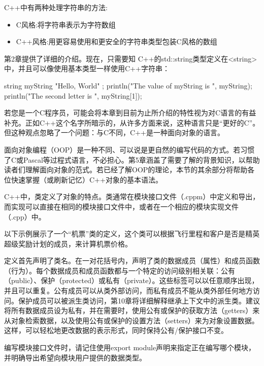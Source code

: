 
C++中有两种处理字符串的方法:

\begin{itemize}
\item
C风格:将字符串表示为字符数组

\item
C++风格:用更容易使用和更安全的字符串类型包装C风格的数组
\end{itemize}

第2章提供了详细的介绍。现在，只需要知 C++的std::string类型定义在<string>中，并且可以像使用基本类型一样使用C++字符串：

\begin{cpp}
string myString { "Hello, World" };
println("The value of myString is {}", myString);
println("The second letter is {}", myString[1]);
\end{cpp}


若您是一个C程序员，可能会将本章到目前为止所介绍的特性视为对C语言的有益补充。正如C++这个名字所暗示的，从许多方面来说，这种语言只是“更好的C”。但这种观点忽略了一个问题：与C不同，C++是一种面向对象的语言。

面向对象编程（OOP）是一种不同、可以说是更自然的编写代码的方式。若习惯了C或Pascal等过程式语言，不必担心。第5章涵盖了需要了解的背景知识，以帮助读者们理解面向对象的范式。若已经了解OOP的理论，本节的其余部分将帮助各位快速掌握（或刷新记忆）C++对象的基本语法。


C++中，类定义了对象的特点。类通常在模块接口文件（.cppm）中定义和导出，而实现可以直接在相同的模块接口文件中，或者在一个相应的模块实现文件（.cpp）中。

以下示例展示了一个“机票”类的定义，这个类可以根据飞行里程和客户是否是精英超级奖励计划的成员，来计算机票价格。

定义首先声明了类名。在一对花括号内，声明了类的数据成员（属性）和成员函数（行为）。每个数据成员和成员函数都与一个特定的访问级别相关联：公有（public）、保护（protected）或私有（private）。这些标签可以以任意顺序出现，并且可以重复。公有成员可以从类外部访问，而私有成员不能从类外部任何地方访问。保护成员可以被派生类访问，第10章将详细解释继承上下文中的派生类。建议将所有数据成员设为私有，并在需要时，使用公有或保护的获取方法（getters）来从对象检索数据，以及使用公有或保护的设置方法（setters）来为对象设置数据。这样，可以轻松地更改数据的表示形式，同时保持公有/保护接口不变。

编写模块接口文件时，请记住使用export module声明来指定正在编写哪个模块，并明确导出希望向模块用户提供的数据类型。

